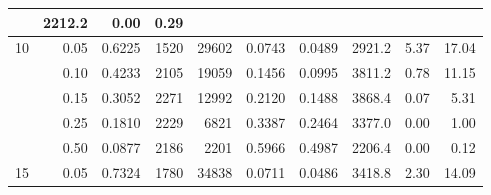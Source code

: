 \begin{table}[htbp]
\begin{tabular}{r r r r r r r r r r}
                           & 2212.2                         & 0.00
                           & 0.29                                                                     \\
    \midrule
    10                     & 0.05                           & 0.6225                         & 1520
                           & 29602                          & 0.0743                         & 0.0489
                           & 2921.2                         & 5.37
                           & 17.04                                                                    \\
                           & 0.10                           & 0.4233                         & 2105
                           & 19059                          & 0.1456                         & 0.0995
                           & 3811.2                         & 0.78
                           & 11.15                                                                    \\
                           & 0.15                           & 0.3052                         & 2271
                           & 12992                          & 0.2120                         & 0.1488
                           & 3868.4                         & 0.07
                           & 5.31                                                                     \\
                           & 0.25                           & 0.1810                         & 2229
                           & 6821                           & 0.3387                         & 0.2464
                           & 3377.0                         & 0.00
                           & 1.00                                                                     \\
                           & 0.50                           & 0.0877                         & 2186
                           & 2201                           & 0.5966                         & 0.4987
                           & 2206.4                         & 0.00
                           & 0.12                                                                     \\
    \midrule
    15                     & 0.05                           & 0.7324                         & 1780
                           & 34838                          & 0.0711                         & 0.0486
                           & 3418.8                         & 2.30
                           & 14.09                                                                    \\

\end{tabular}
\end{table}
